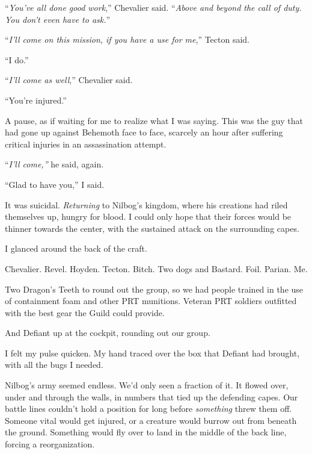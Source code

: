 ``\emph{You've all done good work},'' Chevalier said.  ``\emph{Above and beyond the call of duty.  You don't even have to ask.}''



``\emph{I'll come on this mission, if you have a use for me},'' Tecton said.



``I do.''



``\emph{I'll come as well},'' Chevalier said.



``You're injured.''



A pause, as if waiting for me to realize what I was saying.  This was the guy that had gone up against Behemoth face to face, scarcely an hour after suffering critical injuries in an assassination attempt.



``\emph{I'll come,'' }he said, again.



``Glad to have you,'' I said.



\sectionbreak



It was suicidal.  \emph{Returning }to Nilbog's kingdom, where his creations had riled themselves up, hungry for blood.  I could only hope that their forces would be thinner towards the center, with the sustained attack on the surrounding capes.



I glanced around the back of the craft.



Chevalier.  Revel.  Hoyden.  Tecton.  Bitch.  Two dogs and Bastard.  Foil.  Parian.  Me.



Two Dragon's Teeth to round out the group, so we had people trained in the use of containment foam and other PRT munitions.  Veteran PRT soldiers outfitted with the best gear the Guild could provide.



And Defiant up at the cockpit, rounding out our group.



I felt my pulse quicken.  My hand traced over the box that Defiant had brought, with all the bugs I needed.



Nilbog's army seemed endless.  We'd only seen a fraction of it.  It flowed over, under and through the walls, in numbers that tied up the defending capes.  Our battle lines couldn't hold a position for long before \emph{something} threw them off.  Someone vital would get injured, or a creature would burrow out from beneath the ground.  Something would fly over to land in the middle of the back line, forcing a reorganization.



